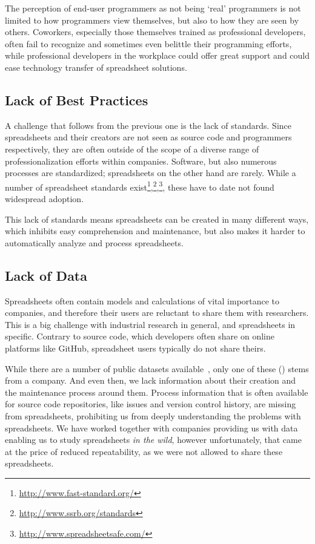 \documentclass[conference]{IEEEtran}
\begin{document}
The perception of end-user programmers as not being `real' programmers is not limited to how programmers view themselves, but also to how they are seen by others. Coworkers, especially those themselves trained as professional developers, often fail to recognize and sometimes even belittle their programming efforts, while professional developers in the workplace could offer great support and could ease technology transfer of spreadsheet solutions.

\subsection{Lack of Best Practices}
A challenge that follows from the previous one is the lack of standards. Since spreadsheets and their creators are not seen as source code and programmers respectively, they are often outside of the scope of a diverse range of professionalization efforts within companies. Software, but also numerous processes are standardized; spreadsheets on the other hand are rarely. While a number of spreadsheet standards exist\footnote{\url{http://www.fast-standard.org/}},\footnote{\url{http://www.ssrb.org/standards}},\footnote{\url{http://www.spreadsheetsafe.com/}}, these have to date not found widespread adoption. 

This lack of standards means spreadsheets can be created in many different ways, which inhibits easy comprehension and maintenance, but also makes it harder to automatically analyze and process spreadsheets.

\subsection{Lack of Data}
Spreadsheets often contain models and calculations of vital importance to companies, and therefore their users are reluctant to share them with researchers. This is a big challenge with industrial research in general, and spreadsheets in specific. Contrary to source code, which developers often share on online platforms like GitHub, spreadsheet users typically do not share theirs. 

While there are a number of public datasets available~\cite{fisher_euses_2005, Hermans2015, conf/msr/BarikLSSM15}, only one of these (\cite{Hermans2015}) stems from a company. And even then, we lack information about their creation and the maintenance process around them. Process information that is often available for source code repositories, like issues and version control history, are missing from spreadsheets, prohibiting us from deeply understanding the problems with spreadsheets. We have worked together with companies providing us with data~\cite{hermans_supporting_2011, hermans_detecting_2012, hermans_detecting_2012-1, hermans_detecting_2014, Jansen2015} enabling us to study spreadsheets \emph{in the wild}, however unfortunately, that came at the price of reduced repeatability, as we were not allowed to share these spreadsheets.
\end{document}
